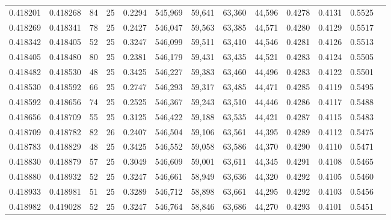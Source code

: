 \begin{tabular}{rrrrrrrrrrrrr}
0.418201 & 0.418268 &    84 &  25 &                                     0.2294 & 545,969 &  59,641 &  63,360 &  44,596 & 0.4278 & 0.4131 & 0.5525 \\
0.418269 & 0.418341 &    78 &  25 &                                     0.2427 & 546,047 &  59,563 &  63,385 &  44,571 & 0.4280 & 0.4129 & 0.5517 \\
0.418342 & 0.418405 &    52 &  25 &                                     0.3247 & 546,099 &  59,511 &  63,410 &  44,546 & 0.4281 & 0.4126 & 0.5513 \\
0.418405 & 0.418480 &    80 &  25 &                                     0.2381 & 546,179 &  59,431 &  63,435 &  44,521 & 0.4283 & 0.4124 & 0.5505 \\
0.418482 & 0.418530 &    48 &  25 &                                     0.3425 & 546,227 &  59,383 &  63,460 &  44,496 & 0.4283 & 0.4122 & 0.5501 \\
0.418530 & 0.418592 &    66 &  25 &                                     0.2747 & 546,293 &  59,317 &  63,485 &  44,471 & 0.4285 & 0.4119 & 0.5495 \\
0.418592 & 0.418656 &    74 &  25 &                                     0.2525 & 546,367 &  59,243 &  63,510 &  44,446 & 0.4286 & 0.4117 & 0.5488 \\
0.418656 & 0.418709 &    55 &  25 &                                     0.3125 & 546,422 &  59,188 &  63,535 &  44,421 & 0.4287 & 0.4115 & 0.5483 \\
0.418709 & 0.418782 &    82 &  26 &                                     0.2407 & 546,504 &  59,106 &  63,561 &  44,395 & 0.4289 & 0.4112 & 0.5475 \\
0.418783 & 0.418829 &    48 &  25 &                                     0.3425 & 546,552 &  59,058 &  63,586 &  44,370 & 0.4290 & 0.4110 & 0.5471 \\
0.418830 & 0.418879 &    57 &  25 &                                     0.3049 & 546,609 &  59,001 &  63,611 &  44,345 & 0.4291 & 0.4108 & 0.5465 \\
0.418880 & 0.418932 &    52 &  25 &                                     0.3247 & 546,661 &  58,949 &  63,636 &  44,320 & 0.4292 & 0.4105 & 0.5460 \\
0.418933 & 0.418981 &    51 &  25 &                                     0.3289 & 546,712 &  58,898 &  63,661 &  44,295 & 0.4292 & 0.4103 & 0.5456 \\
0.418982 & 0.419028 &    52 &  25 &                                     0.3247 & 546,764 &  58,846 &  63,686 &  44,270 & 0.4293 & 0.4101 & 0.5451 \\

\end{tabular}
